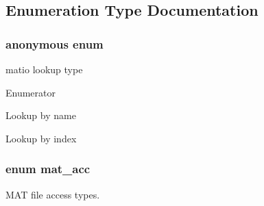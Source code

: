 \subsection{Enumeration Type Documentation}
\hypertarget{group__MAT_ga06fc87d81c62e9abb8790b6e5713c55b}{\subsubsection[{anonymous enum}]{\setlength{\rightskip}{0pt plus 5cm}anonymous enum}}\label{group__MAT_ga06fc87d81c62e9abb8790b6e5713c55b}
matio lookup type \begin{Desc}
\item[Enumerator]\par
\begin{description}
\item[{\em 
\hypertarget{group__MAT_gga06fc87d81c62e9abb8790b6e5713c55ba8938378c70879fe916177141cce0417e}{B\-Y\-\_\-\-N\-A\-M\-E}\label{group__MAT_gga06fc87d81c62e9abb8790b6e5713c55ba8938378c70879fe916177141cce0417e}
}]Lookup by name \item[{\em 
\hypertarget{group__MAT_gga06fc87d81c62e9abb8790b6e5713c55ba5f4d5606de1ec27f80f4a50186909005}{B\-Y\-\_\-\-I\-N\-D\-E\-X}\label{group__MAT_gga06fc87d81c62e9abb8790b6e5713c55ba5f4d5606de1ec27f80f4a50186909005}
}]Lookup by index \end{description}
\end{Desc}
\hypertarget{group__MAT_gaa9dcbc70f538af79bd557593ff6b5cdb}{
\subsubsection[{mat\-\_\-acc}]{\setlength{\rightskip}{0pt plus 5cm}enum {\bf mat\-\_\-acc}}}\label{group__MAT_gaa9dcbc70f538af79bd557593ff6b5cdb}


M\-A\-T file access types. 

